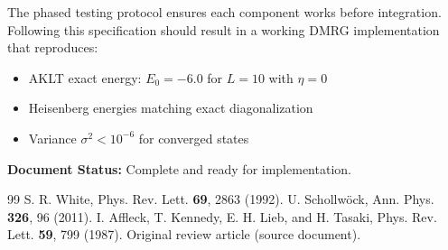 \documentclass[aps,prb,onecolumn,scriptaddress]{revtex4-2}
\begin{document}
	The phased testing protocol ensures each component works before integration. Following this specification should result in a working DMRG implementation that reproduces:
	\begin{itemize}
		\item AKLT exact energy: $E_0 = -6.0$ for $L=10$ with $\eta = 0$
		\item Heisenberg energies matching exact diagonalization
		\item Variance $\sigma^2 < 10^{-6}$ for converged states
	\end{itemize}
	
	\textbf{Document Status:} Complete and ready for implementation.
	
	\begin{thebibliography}{99}
		 S. R. White, Phys. Rev. Lett. \textbf{69}, 2863 (1992).
		 U. Schollwöck, Ann. Phys. \textbf{326}, 96 (2011).
		 I. Affleck, T. Kennedy, E. H. Lieb, and H. Tasaki, Phys. Rev. Lett. \textbf{59}, 799 (1987).
		 Original review article (source document).
	\end{thebibliography}
	
\end{document}

